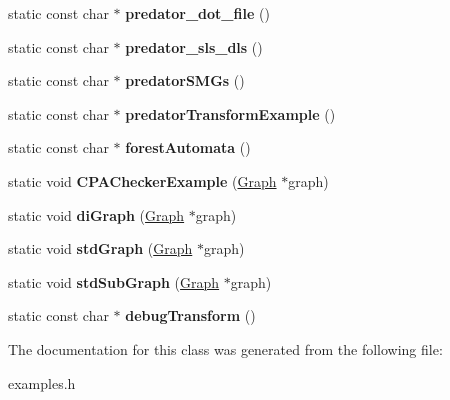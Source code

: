 \begin{DoxyCompactItemize}
\item 
static const char $\ast$ {\bfseries predator\+\_\+dot\+\_\+file} ()\hypertarget{class_examples_a3422f35e49d1a7e1202d3cbd502c27c9}{}\label{class_examples_a3422f35e49d1a7e1202d3cbd502c27c9}

\item 
static const char $\ast$ {\bfseries predator\+\_\+sls\+\_\+dls} ()\hypertarget{class_examples_ac75881d6fa3c3355c91b4d50b8846fa1}{}\label{class_examples_ac75881d6fa3c3355c91b4d50b8846fa1}

\item 
static const char $\ast$ {\bfseries predator\+S\+M\+Gs} ()\hypertarget{class_examples_aa341663304282bbbcb475c42a8303d98}{}\label{class_examples_aa341663304282bbbcb475c42a8303d98}

\item 
static const char $\ast$ {\bfseries predator\+Transform\+Example} ()\hypertarget{class_examples_a878a64d9714f169ebfed7623c4ac7bc3}{}\label{class_examples_a878a64d9714f169ebfed7623c4ac7bc3}

\item 
static const char $\ast$ {\bfseries forest\+Automata} ()\hypertarget{class_examples_a006206419fd229e2dce7e911d2a4d41b}{}\label{class_examples_a006206419fd229e2dce7e911d2a4d41b}

\item 
static void {\bfseries C\+P\+A\+Checker\+Example} (\hyperlink{classmemgraph_1_1_graph}{Graph} $\ast$graph)\hypertarget{class_examples_a002e7032623652b3fc5a4b4776cdd066}{}\label{class_examples_a002e7032623652b3fc5a4b4776cdd066}

\item 
static void {\bfseries di\+Graph} (\hyperlink{classmemgraph_1_1_graph}{Graph} $\ast$graph)\hypertarget{class_examples_a1dc72042c68ac60b42dc60efa3796544}{}\label{class_examples_a1dc72042c68ac60b42dc60efa3796544}

\item 
static void {\bfseries std\+Graph} (\hyperlink{classmemgraph_1_1_graph}{Graph} $\ast$graph)\hypertarget{class_examples_ad684722f9786a1034d1e0bf9f485a27d}{}\label{class_examples_ad684722f9786a1034d1e0bf9f485a27d}

\item 
static void {\bfseries std\+Sub\+Graph} (\hyperlink{classmemgraph_1_1_graph}{Graph} $\ast$graph)\hypertarget{class_examples_ae5ce1909975555fcec4e6831f8c67721}{}\label{class_examples_ae5ce1909975555fcec4e6831f8c67721}

\item 
static const char $\ast$ {\bfseries debug\+Transform} ()\hypertarget{class_examples_ab3c25b9d0f072c36a6f1c3447cc23088}{}\label{class_examples_ab3c25b9d0f072c36a6f1c3447cc23088}

\end{DoxyCompactItemize}


The documentation for this class was generated from the following file\+:\begin{DoxyCompactItemize}
\item 
examples.\+h\end{DoxyCompactItemize}
